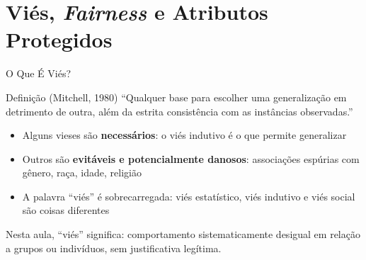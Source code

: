 \documentclass[aspectratio=169,xcolor=dvipsnames]{beamer}
\begin{document}
  \section{Viés, \textit{Fairness} e Atributos Protegidos}

  \begin{frame}{O Que É Viés?}
    \begin{block}{Definição (Mitchell, 1980)}
      \enquote{Qualquer base para escolher uma generalização em detrimento de outra, além da estrita consistência com as instâncias observadas.}
    \end{block}

    \vspace{0.4em}
    \begin{itemize}\setlength{\itemsep}{0.3em}
      \item Alguns vieses são \textbf{necessários}: o viés indutivo é o que permite generalizar
      \item Outros são \textbf{evitáveis e potencialmente danosos}: associações espúrias com gênero, raça, idade, religião
      \item A palavra \enquote{viés} é sobrecarregada: viés estatístico, viés indutivo e viés social são coisas diferentes
    \end{itemize}

    \vspace{0.3em}
    Nesta aula, \enquote{viés} significa: comportamento sistematicamente desigual em relação a grupos ou indivíduos, sem justificativa legítima.
  \end{frame}
\end{document}
